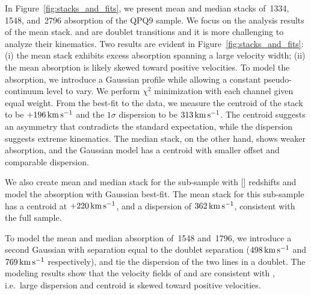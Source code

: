 \documentclass[iop]{emulateapj}
\begin{document}
In Figure~\ref{fig:stacks_and_fits}, we present mean and median stacks of \,1334, 
\,1548, and \,2796 absorption of the QPQ9 sample. We focus on the 
analysis results of the  mean stack.  and  are doublet transitions 
and it is more challenging to analyze their kinematics.
Two results are evident in Figure~\ref{fig:stacks_and_fits}: (i) the mean  stack 
exhibits excess absorption spanning a large velocity width; (ii) the mean absorption is likely 
skewed toward positive velocities. To model the absorption, we introduce a Gaussian profile while 
allowing a constant pseudo-continuum level to vary. We perform $\chi^2$ minimization with each 
channel given equal weight. From the best-fit to the data, we measure the centroid of the 
 stack to be $+196\,{\rm km\,s^{-1}}$ and the $1\sigma$ dispersion to be 
$313\,{\rm km\,s^{-1}}$. The centroid suggests an asymmetry that contradicts the standard 
expectation, while the dispersion suggests extreme kinematics. The median stack, on the other 
hand, shows weaker absorption, and the Gaussian model has a centroid with smaller offset and 
comparable dispersion. 

We also create mean and median stack for the sub-sample with [] redshifts and model the 
absorption with Gaussian best-fit. The  mean stack for this sub-sample has a centroid at 
$+220\,{\rm km\,s^{-1}}$, and a dispersion of $362\,{\rm km\,s^{-1}}$, consistent with the full 
sample. 

To model the mean and median absorption of \,1548 and \,1796, we introduce a  
second Gaussian with separation equal to the doublet separation ($498\,{\rm km\,s^{-1}}$ and 
$769\,{\rm km\,s^{-1}}$ respectively), and tie the dispersion of the two lines in a doublet. The 
modeling results show that the velocity fields of  and  are consistent with 
, i.e.\ large dispersion and centroid is skewed toward positive velocities. 
\end{document}
